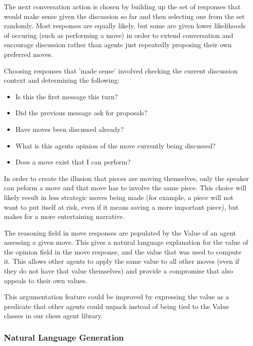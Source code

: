 \documentclass[conference]{IEEEtran}
\begin{document}
The next conversation action is chosen by building up the set of responses that would make sense given the discussion so far and then selecting one from the set randomly. Most responses are equally likely, but some are given lower likelihoods of occuring (such as performing a move) in order to extend conversation and encourage discussion rather than agents just repeatedly proposing their own preferred moves.

Choosing responses that 'made sense' involved checking the current discussion context and determining the following:
\begin{itemize}
	\item Is this the first message this turn?
	\item Did the previous message ask for proposals?
	\item Have moves been discussed already?
	\item What is this agents opinion of the move currently being discussed?
	\item Does a move exist that I can perform?
\end{itemize}

In order to create the illusion that pieces are moving themselves, only the speaker can peform a move and that move has to involve the same piece. This choice will likely result in less strategic moves being made (for example, a piece will not want to put itself at risk, even if it means saving a more important piece), but makes for a more entertaining narrative.

The reasoning field in move responses are populated by the Value of an agent assessing a given move. This gives a natural language explanation for the value of the opinion field in the move response, and the value that was used to compute it. This allows other agents to apply the same value to all other moves (even if they do not have that value themselves) and provide a compromise that also appeals to their own values. 

This argumentation feature could be improved by expressing the value as a predicate that other agents could unpack instead of being tied to the Value classes in our chess agent library. 

\subsubsection{Natural Language Generation}
\end{document}
